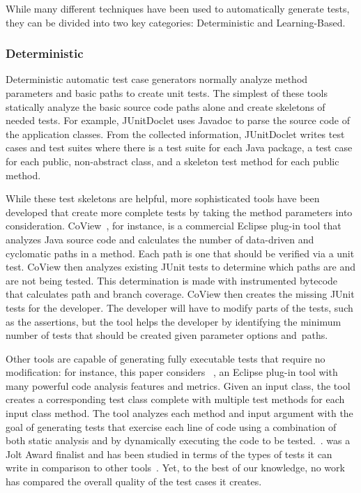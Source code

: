 While many different techniques have been used to automatically generate tests, they can be divided into two key categories: Deterministic and Learning-Based.

\subsubsection{Deterministic}

Deterministic automatic test case generators normally analyze method parameters and basic paths to create unit tests.  The simplest of these tools statically analyze the basic source code paths alone and create skeletons of  needed tests.  For example, JUnitDoclet \cite{JUnitDoclet} uses Javadoc to parse the source code of the application classes. From the collected information, JUnitDoclet writes test cases and test suites where there is a test suite for each Java package, a test case for each public, non-abstract class, and a skeleton test method for each public method. %


While these test skeletons are helpful, more sophisticated tools have been developed that create more complete tests by taking the method parameters into consideration. CoView~\cite{CoView}, for instance, is a commercial Eclipse plug-in tool that analyzes Java source code and calculates the number of data-driven and cyclomatic paths in a method. Each path is one that should be verified via a unit test. CoView then analyzes existing JUnit tests to determine which paths are and are not being tested. This determination is made with instrumented bytecode that calculates path and branch coverage. CoView then creates the missing JUnit tests for the developer. The developer will have to modify parts of the tests, such as the assertions, but the tool helps the developer by identifying the minimum number of tests that should be created given parameter options \mbox{and paths}.

Other tools are capable of generating fully executable tests that require no modification: for instance, this paper considers \codepro~\cite{CodePro1}, an Eclipse plug-in tool with many powerful code analysis features and metrics.  Given an input class, the tool creates a corresponding test class complete with multiple test methods for each input class method. The tool analyzes each method and input argument with the goal of generating tests that exercise each line of code using a combination of both static analysis and by dynamically executing the code to be tested.~\cite{CodePro2}.  \codepro was a Jolt Award finalist and has been studied in terms of the types of tests it can write in comparison to other tools~\cite{xie2009}.  Yet, to the best of our knowledge, no work has compared the overall quality of the test cases it creates.


